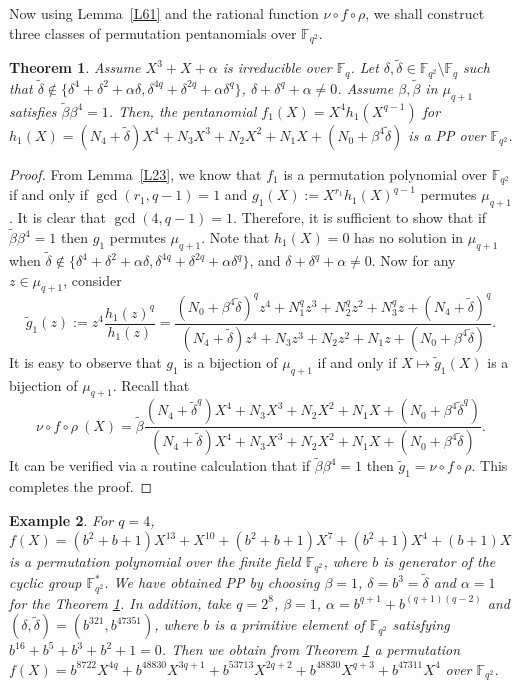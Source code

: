 \documentclass[12pt]{amsart}
\newtheorem{thm}{Theorem}[section]
\newtheorem{exmp}[thm]{Example}
\numberwithin{equation}{section}
\theoremstyle{definition}
\newcommand{\F}{\mathbb F}
\begin{document}
Now using Lemma~\ref{L61} and the rational function $\nu \circ f \circ \rho$, we shall construct three classes of permutation pentanomials over $\F_{q^2}$.

\begin{thm}\label{T60}Assume $X^3+X+\alpha$ is irreducible over $\F_q$. 
Let $\delta, \tilde \delta \in \F_{q^2}\setminus\F_{q}$ such that $\tilde \delta \not \in \{ \delta^4+\delta^2+\alpha \delta, \delta^{4q}+\delta^{2q}+\alpha \delta^q\}$, $\delta+\delta^q+\alpha \neq 0$.
Assume $\beta, \tilde{\beta}$ in $\mu_{q+1}$ satisfies ${\tilde \beta}\beta^4=1$. Then,
the pentanomial
$f_1(X)=X^{4}h_1(X^{q-1})$ for 
$h_1(X)=(N_4+{\tilde \delta}) X^4+N_3X^3+N_2X^2+N_1X+(N_0 + \beta^4{\tilde \delta})$
is a PP over $\F_{q^2}$.
\end{thm}
\begin{proof}
From Lemma~\ref{L23}, we know that $f_1$ is a permutation polynomial over $\F_{q^2}$ if and only if $\gcd(r_1,q-1)=1$ and $g_1(X):=X^{r_1}h_1(X)^{q-1}$ permutes $\mu_{q+1}$. It is clear that $\gcd(4, q-1)=1$. Therefore, it is sufficient to show that if ${\tilde \beta}\beta^4=1$ then $g_1$ permutes $\mu_{q+1}$. Note that $h_1(X)=0$ has no solution in $\mu_{q+1}$ when $\tilde \delta \not \in \{ \delta^4+\delta^2+\alpha \delta, \delta^{4q}+\delta^{2q}+\alpha \delta^q\}$,  and $\delta+\delta^q+\alpha \neq 0$. Now for any $z \in \mu_{q+1}$, consider
 \[
  {\tilde g_1}(z):=z^4\frac{h_1(z)^{q}}{h_1(z)}= \frac{(N_0 + \beta^4{\tilde \delta})^{q}z^4+N_1^{q}z^3 +N_2^{q}z^2+N_3^{q}z+(N_4+{\tilde \delta})^{q}}{(N_4+{\tilde \delta}) z^4+N_3z^3+N_2z^2+N_1z+(N_0 + \beta^4{\tilde \delta})}.
 \]
It is easy to observe that $g_1$ is a bijection of $\mu_{q+1}$ if and only if $X \mapsto {\tilde g_1}(X)$ is a bijection of $\mu_{q+1}$. 
Recall that 
$$
\nu \circ f \circ \rho ~(X) = {\tilde \beta} \frac{(N_4+{\tilde \delta}^q) X^4+N_3X^3+N_2X^2+N_1X+(N_0 + \beta^4{\tilde \delta}^q) }{(N_4+{\tilde \delta}) X^4+N_3X^3+N_2X^2+N_1X+(N_0 + \beta^4{\tilde \delta}) }.
$$
It can be verified via a routine calculation that if ${\tilde \beta}\beta^4=1$ then ${\tilde g_1}= \nu \circ f \circ \rho$. This completes the proof.
\end{proof}

\begin{exmp}\label{EX41}
For $q=4$, $f(X)=(b^2+b+1)X^{13}+X^{10}+(b^2+b+1)X^7+(b^2+1)X^4+(b+1)X$ is a permutation polynomial over the finite field $\F_{q^2}$, where $b$ is generator of the cyclic group $\F_{q^2}^{*}$. We have obtained PP by choosing $\beta=1$, $\delta=b^3=\tilde{\delta}$ and $\alpha=1$ for the Theorem \ref{T60}. In addition, take $q=2^8$, $\beta=1$, $\alpha = b^{q+1} + b^{(q+1)(q-2)}$ and $(\delta, \tilde{\delta})=(b^{321}, b^{47351})$, where $b$ is a primitive element of $\F_{q^2}$ satisfying $b^{16}+b^5+b^3+b^2+1=0$.
Then we obtain from Theorem \ref{T60} a permutation $f(X) = b^{8722}X^{4q} +b^{48830}X^{3q+1} + b^{53713}X^{2q+2} + b^{48830}X^{q+3} + b^{47311}X^4$ over $\F_{q^2}$.
\end{exmp}
\end{document}
